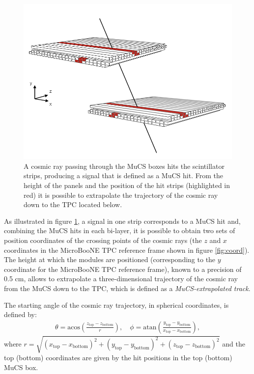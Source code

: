 \documentclass[a4paper,11pt]{article}
\begin{document}
\begin{figure}[htbp]
  \begin{center}
    \includegraphics[width=0.7\linewidth]{figures/boxes.png}
    \caption{A cosmic ray passing through the MuCS boxes hits the scintillator strips, producing a signal that is defined as a MuCS hit. From the height of the panels and the position of the hit strips (highlighted in red) it is possible to extrapolate the trajectory of the cosmic ray down to the TPC located below.} \label{fig:boxes}
  \end{center}
\end{figure}

As illustrated in figure \ref{fig:boxes}, a signal in one strip corresponds to a MuCS hit and, combining the MuCS hits in each bi-layer, it is possible to obtain two sets of position coordinates of the crossing points of the cosmic rays (the $z$ and $x$ coordinates in the MicroBooNE TPC reference frame shown in figure \ref{fig:coord}). The height at which the modules are positioned (corresponding to the $y$ coordinate for the MicroBooNE TPC reference frame), known to a precision of 0.5 cm, allows to extrapolate a three-dimensional trajectory of the cosmic ray from the MuCS down to the TPC, which is defined as a \emph{MuCS-extrapolated track}.


The starting angle of the cosmic ray trajectory, in spherical coordinates, is defined by:
\begin{align}\label{eq:angles}
  \theta = \mathrm{acos}\left(\frac{z_{\mathrm{top}}-z_{\mathrm{bottom}}}{r}\right), \quad
  \phi = \mathrm{atan}\left(\frac{y_{\mathrm{top}}-y_{\mathrm{bottom}}}{x_{\mathrm{top}}-x_{\mathrm{bottom}}}\right),
\end{align}
where $r = \sqrt{(x_{\mathrm{top}}-x_{\mathrm{bottom}})^2+(y_{\mathrm{top}}-y_{\mathrm{bottom}})^2+(z_{\mathrm{top}}-z_{\mathrm{bottom}})^2}$ and the top (bottom) coordinates are given by the hit positions in the top (bottom) MuCS box.
\end{document}
